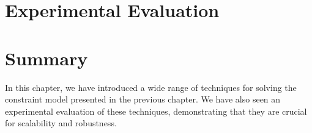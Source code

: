 \section{Experimental Evaluation}




\section{Summary}

In this chapter, we have introduced a wide range of techniques for solving the
\gls{constraint model} presented in the previous chapter.
%
We have also seen an experimental evaluation of these techniques, demonstrating
that they are crucial for scalability and robustness.
